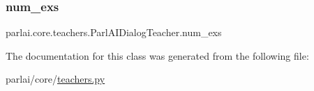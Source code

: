 \subsubsection{\texorpdfstring{num\+\_\+exs}{num\_exs}}
{\footnotesize\ttfamily parlai.\+core.\+teachers.\+Parl\+A\+I\+Dialog\+Teacher.\+num\+\_\+exs}



The documentation for this class was generated from the following file\+:\begin{DoxyCompactItemize}
\item 
parlai/core/\hyperlink{teachers_8py}{teachers.\+py}\end{DoxyCompactItemize}
